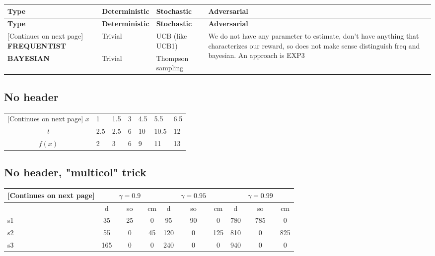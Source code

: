 \begin{tabularx}{\linewidth}{X X X X}
    \toprule
    \textbf{Type} & \textbf{Deterministic} & \textbf{Stochastic} & \textbf{Adversarial}\\
    \midrule
    \endfirsthead
    \toprule
    \textbf{Type} & \textbf{Deterministic} & \textbf{Stochastic} & \textbf{Adversarial}\\
    \midrule
    \endhead
    \midrule
    \footnotesize [Continues on next page]
    \endfoot
    \bottomrule
    \endlastfoot
    \textbf{FREQUENTIST} & Trivial & UCB (like UCB1) & \multirow{2}{5.5cm}{We do not have any parameter to estimate, don't have anything that characterizes our reward, so does not make sense distinguish freq and bayesian. An approach is EXP3}\\[4ex] \cmidrule{1-3}
    \textbf{BAYESIAN } & Trivial & Thompson sampling \\[4ex]
\end{tabularx}

\subsection{No header}
\begin{tabularx}{\linewidth}{c|X X X X X X}
    \toprule
    \endfirsthead
    \toprule
    \midrule
    \endhead
    \footnotesize [Continues on next page]
    \endfoot
    \bottomrule
    \endlastfoot
    $x$ & 1 & 1.5 & 3 & 4.5 & 5.5 & 6.5\\
    $t$ & 2.5 & 2.5 & 6 & 10 & 10.5 & 12\\ \midrule
    $f(x)$ & 2 & 3 & 6 & 9 & 11 & 13
\end{tabularx}

\subsection{No header, "multicol" trick}
\begin{tabularx}{\linewidth}{X|c c c|c c c|c c c}
    \toprule
    \endfirsthead
    \toprule
    \midrule
    \endhead
    \midrule
    \footnotesize [Continues on next page]
    \endfoot
    \bottomrule
    \endlastfoot
    & & $\gamma=0.9$ & & & $\gamma=0.95$ & & & $\gamma=0.99$ &\\ \midrule
    & d & so & cm & d & so & cm & d & so & cm\\ \midrule
    s1 & 35 & 25 & 0 & 95 & 90 & 0 & 780 & 785 & 0\\ \midrule
    s2 & 55 & 0 & 45 & 120 & 0 & 125 & 810 & 0 & 825\\ \midrule
    s3 & 165 & 0 & 0 & 240 & 0 & 0 & 940 & 0 & 0
\end{tabularx}